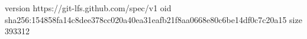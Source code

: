 version https://git-lfs.github.com/spec/v1
oid sha256:154858fa14c8dee378cc020a40ea31eafb21f8aa0668e80c6be14df0c7c20a15
size 393312
